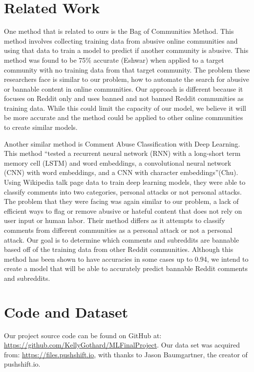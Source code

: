 \documentclass[11pt]{article}[twocolumn]
\begin{document}
\section{Related Work}
One method that is related to ours is the Bag of Communities Method. This method involves collecting training data from abusive online communities and using that data to train a model to predict if another community is abusive. This method was found to be 75\% accurate (Eshwar) when applied to a target community with no training data from that target community. The problem these researchers face is similar to our problem, how to automate the search for abusive or bannable content in online communities. Our approach is different because it focuses on Reddit only and uses banned and not banned Reddit communities as training data. While this could limit the capacity of our model, we believe it will be more accurate and the method could be applied to other online communities to create similar models.

Another similar method is Comment Abuse Classification with Deep Learning. This method ``tested a recurrent neural network (RNN) with a long-short term memory cell (LSTM) and word embeddings, a convolutional neural network (CNN) with word embeddings, and a CNN with character embeddings''(Chu). Using Wikipedia talk page data to train deep learning models, they were able to classify comments into two categories, personal attacks or not personal attacks. The problem that they were facing was again similar to our problem, a lack of efficient ways to flag or remove abusive or hateful content that does not rely on user input or human labor. Their method differs as it attempts to classify comments from different communities as a personal attack or not a personal attack. Our goal is to determine which comments and subreddits are bannable based off of the training data from other Reddit communities. Although this method has been shown to have accuracies in some cases up to 0.94, we intend to create a model that will be able to accurately predict bannable Reddit comments and subreddits.


\section{Code and Dataset}
Our project source code can be found on GitHub at: \url{https://github.com/KellyGothard/MLFinalProject}. Our data set was acquired from: \url{https://files.pushshift.io}, with thanks to Jason Baumgartner, the creator of pushshift.io.
\end{document}
